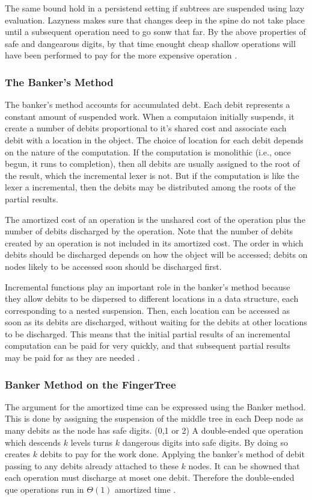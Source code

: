 The same bound hold in a persistend setting if subtrees are suspended using lazy
evaluation. Lazyness makes sure that changes deep in the spine do not take place
until a subsequent operation need to go sonw that far. By the above properties
of safe and dangearous digits, by that time enought cheap shallow operations
will have been performed to pay for the more expensive operation \cite{fingertree}.

\subsubsection{The Banker's Method}
The banker's method accounts for accumulated debt. Each debit represents
a constant amount of suspended work. When a computaion initially suspends, it
create a number of debits proportional to it's shared cost and
associate each debit with a location in the object. The choice of location for
each debit depends on the nature of the computation. If the computation is
monolithic (i.e., once begun, it runs to completion), then all debits are
usually assigned to the root of the result, which the incremental lexer is not. 
But if the computation is like the lexer a incremental, then the debits may be 
distributed among the roots of the partial results.

The amortized cost of an operation is the unshared cost of the operation
plus the number of debits discharged by the operation. Note that the number
of debits created by an operation is not included in its amortized cost. The
order in which debits should be discharged depends on how the object will
be accessed; debits on nodes likely to be accessed soon should be discharged
first.

Incremental functions play an important role in the banker's method because
they allow debits to be dispersed to different locations in a data structure,
each corresponding to a nested suspension. Then, each location can be accessed
as soon as its debits are discharged, without waiting for the debits at other
locations to be discharged. This means that the initial partial results of
an incremental computation can be paid for very quickly, and that subsequent
partial results may be paid for as they are needed \cite{Okasaki1999}.

\subsubsection{Banker Method on the FingerTree}
The argument for the amortized time can be expressed using the Banker method.
This is done by assigning the suspension of the middle tree in each Deep node
as many debits as the node has safe digits. (0,1 or 2) A double-ended que
operation which descends $k$ levels turns $k$ dangerous digits into safe digits.
By doing so creates $k$ debits to pay for the work done.
Applying the banker's method of debit passing to any debits already attached to
these $k$ nodes. It can be showned that each operation must discharge at moset
one debit. Therefore the double-ended que operations run in $\Theta(1)$
amortized time \cite{fingertree}.

